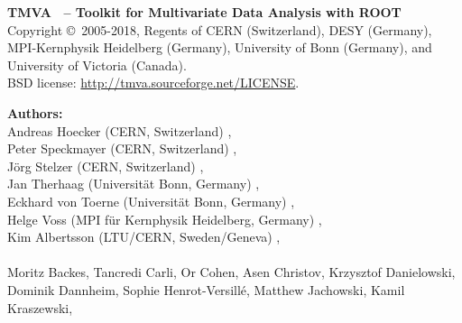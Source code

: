 \begin{center}
{\small\sf
{\sf\bfseries TMVA \TMVAVersion\ -- Toolkit for Multivariate Data Analysis with ROOT}  \\
Copyright 
\copyright\  2005-2018, Regents of 
CERN (Switzerland),  
DESY (Germany),
MPI-Kernphysik Heidelberg (Germany),
University of Bonn (Germany),
and University of Victoria (Canada). \\
BSD license: \url{http://tmva.sourceforge.net/LICENSE}. 

{\sf\bfseries Authors:} \\
Andreas Hoecker (CERN, Switzerland) , \\
Peter Speckmayer (CERN, Switzerland) , \\
J\"org Stelzer (CERN, Switzerland) ,\\
Jan Therhaag (Universit\"at Bonn, Germany) , \\
Eckhard von Toerne (Universit\"at Bonn, Germany) ,\\
Helge Voss (MPI f\"ur Kernphysik Heidelberg, Germany) ,\\
Kim Albertsson (LTU/CERN, Sweden/Geneva) , \\
\hspace{0.5cm} \\
Moritz Backes, %
Tancredi Carli, %
Or Cohen, %
Asen Christov, %
Krzysztof Danielowski, %
Dominik Dannheim, %
Sophie Henrot-Versill\'e, %
Matthew Jachowski, %
Kamil Kraszewski, %
}
\end{center}
